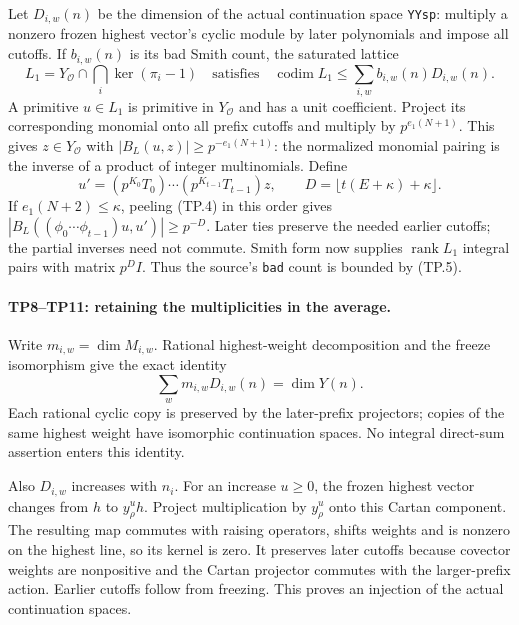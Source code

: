 Let $D_{i,w}(n)$ be the dimension of the actual continuation space
\texttt{YYsp}: multiply a nonzero frozen highest vector's cyclic module by
later polynomials and impose all cutoffs. If $b_{i,w}(n)$ is its bad Smith
count, the saturated lattice
\[
 L_1=Y_{\mathcal O}\cap\bigcap_i\ker(\pi_i-1)
 \quad\text{satisfies}\quad
 \operatorname{codim}L_1\le\sum_{i,w}b_{i,w}(n)D_{i,w}(n).
 \tag{TP.5}
\]
A primitive $u\in L_1$ is primitive in $Y_{\mathcal O}$ and has a unit
coefficient. Project its corresponding monomial onto all prefix cutoffs
and multiply by $p^{e_1(N+1)}$. This gives $z\in Y_{\mathcal O}$ with
$|B_L(u,z)|\ge p^{-e_1(N+1)}$: the normalized monomial pairing is the
inverse of a product of integer multinomials. Define
\[
 u'=(p^{K_0}T_0)\cdots(p^{K_{t-1}}T_{t-1})z,
 \qquad D=\lfloor t(E+\kappa)+\kappa\rfloor.
\]
If $e_1(N+2)\le\kappa$, peeling (TP.4) in this order gives
$|B_L((\phi_0\cdots\phi_{t-1})u,u')|\ge p^{-D}$.
Later ties preserve the needed earlier cutoffs; the partial inverses need
not commute. Smith form now supplies $\operatorname{rank}L_1$ integral
pairs with matrix $p^D I$. Thus the source's \texttt{bad} count is bounded
by (TP.5).

\paragraph{TP8--TP11: retaining the multiplicities in the average.}
Write $m_{i,w}=\dim M_{i,w}$. Rational highest-weight decomposition and the
freeze isomorphism give the exact identity
\[
 \sum_w m_{i,w}D_{i,w}(n)=\dim Y(n).
 \tag{TP.6}
\]
Each rational cyclic copy is preserved by the later-prefix projectors;
copies of the same highest weight have isomorphic continuation spaces.
No integral direct-sum assertion enters this identity.

Also $D_{i,w}$ increases with $n_i$. For an increase $u\ge0$, the frozen
highest vector changes from $h$ to $y_\rho^u h$. Project multiplication by
$y_\rho^u$ onto this Cartan component. The resulting map commutes with
raising operators, shifts weights and is nonzero on the highest line,
so its kernel is zero. It preserves later cutoffs because covector weights
are nonpositive and the Cartan projector commutes with the larger-prefix
action. Earlier cutoffs follow from freezing. This proves an injection of
the actual continuation spaces.

